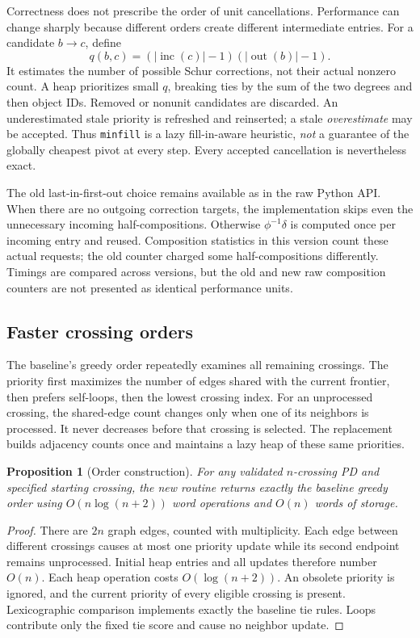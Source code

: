 \documentclass[11pt,a4paper]{article}
\newtheorem{proposition}[theorem]{Proposition}
\theoremstyle{definition}\newtheorem{remark}[theorem]{Remark}
\begin{document}
Correctness does not prescribe the order of unit cancellations. Performance can
change sharply because different orders create different intermediate entries.
For a candidate $b\to c$, define
\[
q(b,c)=(|\operatorname{inc}(c)|-1)(|\operatorname{out}(b)|-1).
\]
It estimates the number of possible Schur corrections, not their actual
nonzero count. A heap prioritizes small $q$, breaking ties by the sum of the
two degrees and then object IDs. Removed or nonunit candidates are discarded.
An underestimated stale priority is refreshed and reinserted; a stale
\emph{overestimate} may be accepted. Thus \texttt{minfill} is a lazy
fill-in-aware heuristic, \emph{not} a guarantee of the globally cheapest pivot
at every step. Every accepted cancellation is nevertheless exact.

The old last-in-first-out choice remains available as
 in the raw Python API. When there are no outgoing
correction targets, the implementation skips even the unnecessary incoming
half-compositions. Otherwise $\phi^{-1}\delta$ is computed once per incoming
entry and reused. Composition statistics in this version count these actual
requests; the old counter charged some half-compositions differently. Timings
are compared across versions, but the old and new raw composition counters are
not presented as identical performance units.

\subsection{Faster crossing orders}
The baseline's greedy order repeatedly examines all remaining crossings.
The priority first maximizes the number of edges shared with the current
frontier, then prefers self-loops, then the lowest crossing index. For an
unprocessed crossing, the shared-edge count changes only when one of its
neighbors is processed. It never decreases before that crossing is selected.
The replacement builds adjacency counts once and maintains a lazy heap of these
same priorities.

\begin{proposition}[Order construction]
For any validated $n$-crossing PD and specified starting crossing, the new
routine returns exactly the baseline greedy order using $O(n\log(n+2))$
word operations and $O(n)$ words of storage.
\end{proposition}
\begin{proof}
There are $2n$ graph edges, counted with multiplicity. Each edge between different
crossings causes at most one priority update while its second endpoint remains
unprocessed. Initial heap entries and all updates therefore number $O(n)$.
Each heap operation costs $O(\log(n+2))$. An obsolete priority is ignored, and
the current priority of every eligible crossing is present. Lexicographic
comparison implements exactly the baseline tie rules. Loops contribute only
the fixed tie score and cause no neighbor update.
\end{proof}
\end{document}
